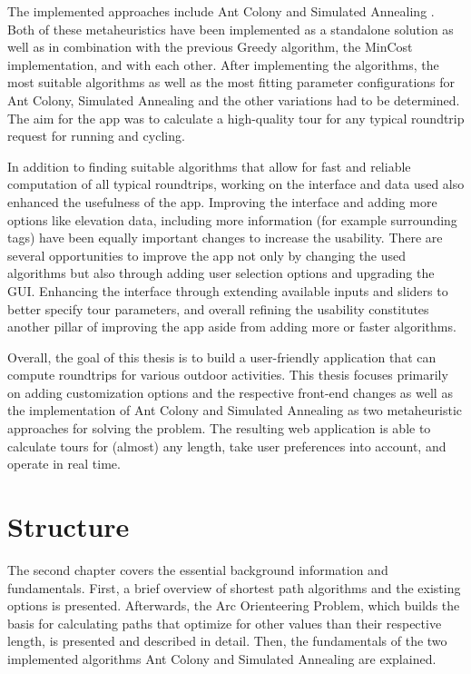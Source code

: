 The implemented approaches include Ant Colony \cite{babaoglu_anthill_2002, dorigo_ant_1996, gendreau_handbook_2010, wang_application_2014} and Simulated Annealing \cite{aarts_simulated_2005, delahaye_simulated_2019, eglese_simulated_1990, zhan_list-based_2016}.
Both of these metaheuristics have been implemented as a standalone solution as well as in combination with the previous Greedy algorithm, the MinCost implementation, and with each other.
After implementing the algorithms, the most suitable algorithms as well as the most fitting parameter configurations for Ant Colony, Simulated Annealing and the other variations had to be determined. 
The aim for the app was to calculate a high-quality tour for any typical roundtrip request for running and cycling.

In addition to finding suitable algorithms that allow for fast and reliable computation of all typical roundtrips, working on the interface and data used also enhanced the usefulness of the app.
Improving the interface and adding more options like elevation data, including more information (for example surrounding tags) have been equally important changes to increase the usability.
There are several opportunities to improve the app not only by changing the used algorithms but also through adding user selection options and upgrading the GUI.
Enhancing the interface through extending available inputs and sliders to better specify tour parameters, and overall refining the usability constitutes another pillar of improving the app aside from adding more or faster algorithms.

Overall, the goal of this thesis is to build a user-friendly application that can compute roundtrips for various outdoor activities.
This thesis focuses primarily on adding customization options and the respective front-end changes as well as the implementation of Ant Colony and Simulated Annealing as two metaheuristic approaches for solving the problem.
The resulting web application is able to calculate tours for (almost) any length, take user preferences into account, and operate in real time.








\section{Structure}
\label{sec:structure}

The second chapter covers the essential background information and fundamentals.
First, a brief overview of shortest path algorithms and the existing options is presented.
Afterwards, the Arc Orienteering Problem, which builds the basis for calculating paths that optimize for other values than their respective length, is presented and described in detail.
Then, the fundamentals of the two implemented algorithms Ant Colony and Simulated Annealing are explained.

